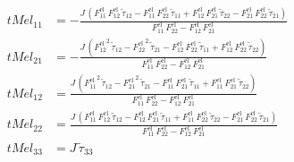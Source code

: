 \begin{align}
tMel_{11} &= -\frac{J\,\left(F_{11}^{\mathrm{el}}\,F_{12}^{\mathrm{el}}\,\tilde{\tau }_{12}-F_{11}^{\mathrm{el}}\,F_{22}^{\mathrm{el}}\,\tilde{\tau }_{11}+F_{12}^{\mathrm{el}}\,F_{21}^{\mathrm{el}}\,\tilde{\tau }_{22}-F_{21}^{\mathrm{el}}\,F_{22}^{\mathrm{el}}\,\tilde{\tau }_{21}\right)}{F_{11}^{\mathrm{el}}\,F_{22}^{\mathrm{el}}-F_{12}^{\mathrm{el}}\,F_{21}^{\mathrm{el}}} \\ 
tMel_{21} &= -\frac{J\,\left({F_{12}^{\mathrm{el}}}^2\,\tilde{\tau }_{12}-{F_{22}^{\mathrm{el}}}^2\,\tilde{\tau }_{21}-F_{12}^{\mathrm{el}}\,F_{22}^{\mathrm{el}}\,\tilde{\tau }_{11}+F_{12}^{\mathrm{el}}\,F_{22}^{\mathrm{el}}\,\tilde{\tau }_{22}\right)}{F_{11}^{\mathrm{el}}\,F_{22}^{\mathrm{el}}-F_{12}^{\mathrm{el}}\,F_{21}^{\mathrm{el}}} \\ 
tMel_{12} &= \frac{J\,\left({F_{11}^{\mathrm{el}}}^2\,\tilde{\tau }_{12}-{F_{21}^{\mathrm{el}}}^2\,\tilde{\tau }_{21}-F_{11}^{\mathrm{el}}\,F_{21}^{\mathrm{el}}\,\tilde{\tau }_{11}+F_{11}^{\mathrm{el}}\,F_{21}^{\mathrm{el}}\,\tilde{\tau }_{22}\right)}{F_{11}^{\mathrm{el}}\,F_{22}^{\mathrm{el}}-F_{12}^{\mathrm{el}}\,F_{21}^{\mathrm{el}}} \\ 
tMel_{22} &= \frac{J\,\left(F_{11}^{\mathrm{el}}\,F_{12}^{\mathrm{el}}\,\tilde{\tau }_{12}-F_{12}^{\mathrm{el}}\,F_{21}^{\mathrm{el}}\,\tilde{\tau }_{11}+F_{11}^{\mathrm{el}}\,F_{22}^{\mathrm{el}}\,\tilde{\tau }_{22}-F_{21}^{\mathrm{el}}\,F_{22}^{\mathrm{el}}\,\tilde{\tau }_{21}\right)}{F_{11}^{\mathrm{el}}\,F_{22}^{\mathrm{el}}-F_{12}^{\mathrm{el}}\,F_{21}^{\mathrm{el}}} \\ 
tMel_{33} &= J\,\tilde{\tau }_{33} 
\end{align}
